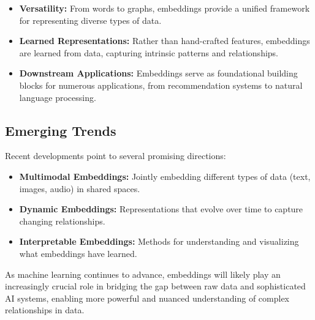 \begin{itemize}[noitemsep]
    \item \textbf{Versatility:} From words to graphs, embeddings provide a unified framework for representing diverse types of data.
    
    \item \textbf{Learned Representations:} Rather than hand-crafted features, embeddings are learned from data, capturing intrinsic patterns and relationships.
    
    \item \textbf{Downstream Applications:} Embeddings serve as foundational building blocks for numerous applications, from recommendation systems to natural language processing.
\end{itemize}

\subsection{Emerging Trends}
Recent developments point to several promising directions:
\begin{itemize}[noitemsep]
    \item \textbf{Multimodal Embeddings:} Jointly embedding different types of data (text, images, audio) in shared spaces.
    
    \item \textbf{Dynamic Embeddings:} Representations that evolve over time to capture changing relationships.
    
    \item \textbf{Interpretable Embeddings:} Methods for understanding and visualizing what embeddings have learned.
\end{itemize}

\noindent
As machine learning continues to advance, embeddings will likely play an increasingly crucial role in bridging the gap between raw data and sophisticated AI systems, enabling more powerful and nuanced understanding of complex relationships in data.

